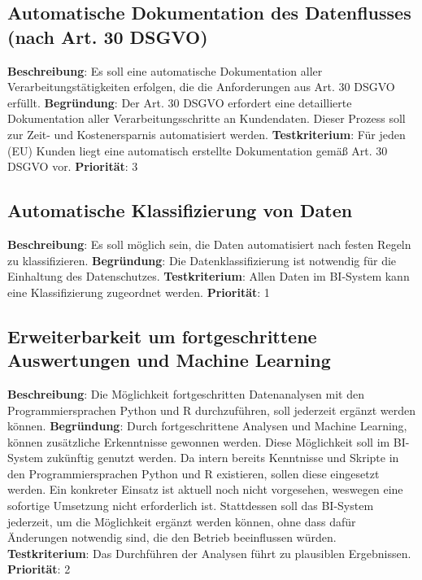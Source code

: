 \subsection[Automatische Dokumentation des Datenflusses]{Automatische Dokumentation des Datenflusses (nach Art. 30 DSGVO)} \label{sec:anforderungsspezifikation:datenflussDokumentation}
\textbf{Beschreibung}: Es soll eine automatische Dokumentation aller Verarbeitungstätigkeiten erfolgen, die die Anforderungen aus Art. 30 DSGVO erfüllt.
\newline \textbf{Begründung}: Der Art. 30 DSGVO erfordert eine detaillierte Dokumentation aller Verarbeitungsschritte an Kundendaten. Dieser Prozess soll zur Zeit- und Kostenersparnis automatisiert werden.
\newline \textbf{Testkriterium}: Für jeden (EU) Kunden liegt eine automatisch erstellte Dokumentation gemäß Art. 30 DSGVO vor.
\newline \textbf{Priorität}: 3

\subsection{Automatische Klassifizierung von Daten} \label{sec:anforderungsspezifikation:DatenKlassifizierung}
\textbf{Beschreibung}: Es soll möglich sein, die Daten automatisiert nach festen Regeln zu klassifizieren. 
\newline \textbf{Begründung}: Die Datenklassifizierung ist notwendig für die Einhaltung des Datenschutzes.
\newline \textbf{Testkriterium}: Allen Daten im BI-System kann eine Klassifizierung zugeordnet werden.
\newline \textbf{Priorität}: 1

\subsection[Erweiterbarkeit um Machine Learning]{Erweiterbarkeit um fortgeschrittene Auswertungen und Machine Learning} \label{sec:anforderungsspezifikation:datenanalysePythonUndR}
\textbf{Beschreibung}: Die Möglichkeit fortgeschritten Datenanalysen mit den Programmiersprachen Python und R durchzuführen, soll jederzeit ergänzt werden können. 
\newline \textbf{Begründung}: Durch fortgeschrittene Analysen und Machine Learning, können zusätzliche Erkenntnisse gewonnen werden. Diese Möglichkeit soll im BI-System zukünftig genutzt werden. Da intern bereits Kenntnisse und Skripte in den Programmiersprachen Python und R existieren, sollen diese eingesetzt werden. Ein konkreter Einsatz ist aktuell noch nicht vorgesehen, weswegen eine sofortige Umsetzung nicht erforderlich ist. Stattdessen soll das BI-System jederzeit, um die Möglichkeit ergänzt werden können, ohne dass dafür Änderungen notwendig sind, die den Betrieb beeinflussen würden. 
\newline \textbf{Testkriterium}: Das Durchführen der Analysen führt zu plausiblen Ergebnissen.
\newline \textbf{Priorität}: 2